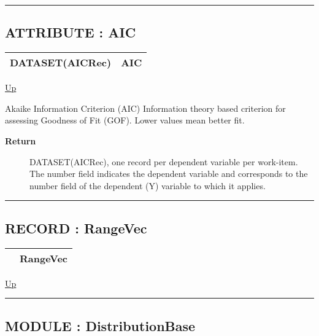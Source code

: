\rule{\textwidth}{0.4pt}
\subsection*{ATTRIBUTE : AIC}
\hypertarget{ecldoc:linearregression.ols.aic}{}

{\renewcommand{\arraystretch}{1.5}
\begin{tabularx}{\textwidth}{|>{\raggedright\arraybackslash}l|X|}
\hline
\hspace{0pt}DATASET(AICRec) & AIC \\
\hline
\end{tabularx}
}

\hyperlink{ecldoc:linearregression.ols}{Up}

\par
Akaike Information Criterion (AIC) Information theory based criterion for assessing Goodness of Fit (GOF). Lower values mean better fit.

\par
\begin{description}
\item [\textbf{Return}] DATASET(AICRec), one record per dependent variable per work-item. The number field indicates the dependent variable and corresponds to the number field of the dependent (Y) variable to which it applies.
\end{description}

\rule{\textwidth}{0.4pt}
\subsection*{RECORD : RangeVec}
\hypertarget{ecldoc:linearregression.ols.rangevec}{}

{\renewcommand{\arraystretch}{1.5}
\begin{tabularx}{\textwidth}{|>{\raggedright\arraybackslash}l|X|}
\hline
\hspace{0pt} & RangeVec \\
\hline
\end{tabularx}
}

\hyperlink{ecldoc:linearregression.ols}{Up}

\par


\rule{\textwidth}{0.4pt}
\subsection*{MODULE : DistributionBase}
\hypertarget{ecldoc:linearregression.ols.distributionbase}{}

